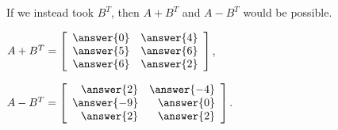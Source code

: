 \documentclass{ximera}
\renewenvironment{mymatrix}[1]
  {%
   \left[\begin{array}{#1}}
  {%
   \end{array}\right]}
\begin{document}
\begin{problem}
\begin{enumerate}
\begin{sol}
      If we instead took $B^T$, then $A+B^T$ and $A-B^T$ would be possible.

      $A+B^T = \begin{mymatrix}{rr}
        \answer{0} & \answer{4}  \\
        \answer{5} & \answer{6}  \\
        \answer{6} & \answer{2} 
      \end{mymatrix}$,\quad

      $A-B^T = \begin{mymatrix}{rr}
        \answer{2} & \answer{-4}  \\
        \answer{-9} & \answer{0}  \\
        \answer{2} & \answer{2} 
      \end{mymatrix}$.



      \end{sol}

  \end{enumerate}
\end{problem}
\end{document}
